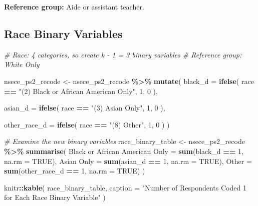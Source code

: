 \documentclass[
]{article}
\newenvironment{Shaded}{\begin{snugshade}}{\end{snugshade}}
\newcommand{\AttributeTok}[1]{\textcolor[rgb]{0.13,0.29,0.53}{#1}}
\newcommand{\CommentTok}[1]{\textcolor[rgb]{0.56,0.35,0.01}{\textit{#1}}}
\newcommand{\ConstantTok}[1]{\textcolor[rgb]{0.56,0.35,0.01}{#1}}
\newcommand{\DecValTok}[1]{\textcolor[rgb]{0.00,0.00,0.81}{#1}}
\newcommand{\FunctionTok}[1]{\textcolor[rgb]{0.13,0.29,0.53}{\textbf{#1}}}
\newcommand{\NormalTok}[1]{#1}
\newcommand{\OtherTok}[1]{\textcolor[rgb]{0.56,0.35,0.01}{#1}}
\newcommand{\SpecialCharTok}[1]{\textcolor[rgb]{0.81,0.36,0.00}{\textbf{#1}}}
\newcommand{\StringTok}[1]{\textcolor[rgb]{0.31,0.60,0.02}{#1}}
\begin{document}
\textbf{Reference group:} Aide or assistant teacher.

\newpage

\subsection{Race Binary Variables}\label{race-binary-variables}

\begin{Shaded}
\begin{Highlighting}[]
\CommentTok{\# Race: 4 categories, so create k {-} 1 = 3 binary variables}
\CommentTok{\# Reference group: White Only}

\NormalTok{nsece\_ps2\_recode }\OtherTok{\textless{}{-}}
\NormalTok{  nsece\_ps2\_recode }\SpecialCharTok{\%\textgreater{}\%}
  \FunctionTok{mutate}\NormalTok{(}
    \AttributeTok{black\_d =} \FunctionTok{ifelse}\NormalTok{(}
\NormalTok{      race }\SpecialCharTok{==} \StringTok{"(2) Black or African American Only"}\NormalTok{, }\DecValTok{1}\NormalTok{, }\DecValTok{0}
\NormalTok{    ),}
    
    \AttributeTok{asian\_d =} \FunctionTok{ifelse}\NormalTok{(}
\NormalTok{      race }\SpecialCharTok{==} \StringTok{"(3) Asian Only"}\NormalTok{, }\DecValTok{1}\NormalTok{, }\DecValTok{0}
\NormalTok{    ),}
    
    \AttributeTok{other\_race\_d =} \FunctionTok{ifelse}\NormalTok{(}
\NormalTok{      race }\SpecialCharTok{==} \StringTok{"(8) Other"}\NormalTok{, }\DecValTok{1}\NormalTok{, }\DecValTok{0}
\NormalTok{    )}
\NormalTok{  )}

\CommentTok{\# Examine the new binary variables}
\NormalTok{race\_binary\_table }\OtherTok{\textless{}{-}}
\NormalTok{  nsece\_ps2\_recode }\SpecialCharTok{\%\textgreater{}\%}
  \FunctionTok{summarise}\NormalTok{(}
    \StringTok{\textasciigrave{}}\AttributeTok{Black or African American Only}\StringTok{\textasciigrave{}} \OtherTok{=} \FunctionTok{sum}\NormalTok{(black\_d }\SpecialCharTok{==} \DecValTok{1}\NormalTok{, }\AttributeTok{na.rm =} \ConstantTok{TRUE}\NormalTok{),}
    \StringTok{\textasciigrave{}}\AttributeTok{Asian Only}\StringTok{\textasciigrave{}} \OtherTok{=} \FunctionTok{sum}\NormalTok{(asian\_d }\SpecialCharTok{==} \DecValTok{1}\NormalTok{, }\AttributeTok{na.rm =} \ConstantTok{TRUE}\NormalTok{),}
    \StringTok{\textasciigrave{}}\AttributeTok{Other}\StringTok{\textasciigrave{}} \OtherTok{=} \FunctionTok{sum}\NormalTok{(other\_race\_d }\SpecialCharTok{==} \DecValTok{1}\NormalTok{, }\AttributeTok{na.rm =} \ConstantTok{TRUE}\NormalTok{)}
\NormalTok{  )}

\NormalTok{knitr}\SpecialCharTok{::}\FunctionTok{kable}\NormalTok{(}
\NormalTok{  race\_binary\_table,}
  \AttributeTok{caption =} \StringTok{"Number of Respondents Coded 1 for Each Race Binary Variable"}
\NormalTok{)}
\end{Highlighting}
\end{Shaded}
\end{document}
